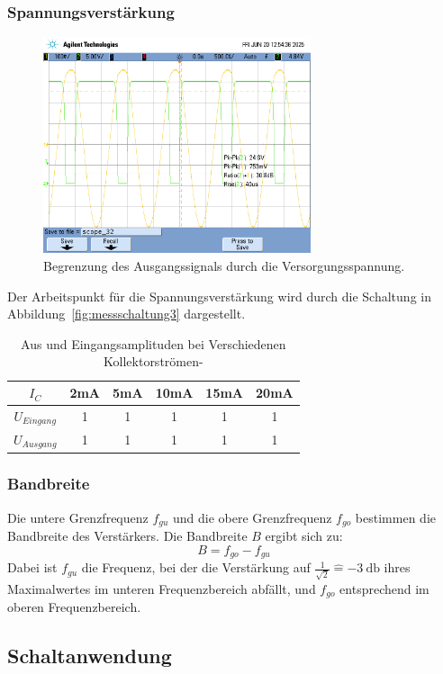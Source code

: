 \documentclass[
	a4paper, %
	12pt, %
]{CSUniSchoolLabReport}
\begin{document}
\subsubsection{Spannungsverstärkung}
\begin{figure}[H]
	\centering
	\includegraphics[width=0.7\textwidth]{Figures/supplyrailskrass.png}
	\caption{Begrenzung des Ausgangssignals durch die Versorgungsspannung.}
	\label{fig:supplyrailskrass}
\end{figure}
Der Arbeitspunkt für die Spannungsverstärkung wird durch die Schaltung in Abbildung~\ref{fig:messschaltung3} dargestellt.
\begin{table}[H]
\centering
\begin{tabular}{c|c|c|c|c|c}
$I_{C}$      & 2mA & 5mA & 10mA & 15mA & 20mA \\ \hline
$U_{Eingang}$ & 1   & 1   & 1    & 1    & 1    \\ \hline
$U_{Ausgang}$ & 1   & 1   & 1    & 1    & 1   
\end{tabular}
\caption{Aus und Eingangsamplituden bei Verschiedenen Kollektorströmen- }
\label{tab:my-table}
\end{table}


\subsubsection{Bandbreite}
Die untere Grenzfrequenz $f_{gu}$ und die obere Grenzfrequenz $f_{go}$ bestimmen die Bandbreite des Verstärkers. Die Bandbreite $B$ ergibt sich zu:
\[
B = f_{go} - f_{gu}
\]
Dabei ist $f_{gu}$ die Frequenz, bei der die Verstärkung auf $\frac{1}{\sqrt{2}} \hat{=}\SI{-3}{\decibel}$ ihres Maximalwertes im unteren Frequenzbereich abfällt, und $f_{go}$ entsprechend im oberen Frequenzbereich.

\subsection{Schaltanwendung}
\end{document}
